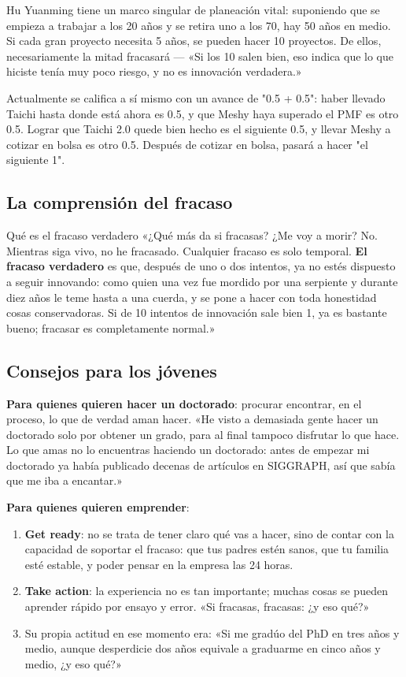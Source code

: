 Hu Yuanming tiene un marco singular de planeación vital: suponiendo que se empieza a trabajar a los 20 años y se retira uno a los 70, hay 50 años en medio. Si cada gran proyecto necesita 5 años, se pueden hacer 10 proyectos. De ellos, necesariamente la mitad fracasará — «Si los 10 salen bien, eso indica que lo que hiciste tenía muy poco riesgo, y no es innovación verdadera.»

Actualmente se califica a sí mismo con un avance de "0.5 + 0.5": haber llevado Taichi hasta donde está ahora es 0.5, y que Meshy haya superado el PMF es otro 0.5. Lograr que Taichi 2.0 quede bien hecho es el siguiente 0.5, y llevar Meshy a cotizar en bolsa es otro 0.5. Después de cotizar en bolsa, pasará a hacer "el siguiente 1".

\subsection{La comprensión del fracaso}

\begin{importantbox}{Qué es el fracaso verdadero}
«¿Qué más da si fracasas? ¿Me voy a morir? No. Mientras siga vivo, no he fracasado. Cualquier fracaso es solo temporal. \textbf{El fracaso verdadero} es que, después de uno o dos intentos, ya no estés dispuesto a seguir innovando: como quien una vez fue mordido por una serpiente y durante diez años le teme hasta a una cuerda, y se pone a hacer con toda honestidad cosas conservadoras. Si de 10 intentos de innovación sale bien 1, ya es bastante bueno; fracasar es completamente normal.»
\end{importantbox}

\subsection{Consejos para los jóvenes}

\textbf{Para quienes quieren hacer un doctorado}: procurar encontrar, en el proceso, lo que de verdad aman hacer. «He visto a demasiada gente hacer un doctorado solo por obtener un grado, para al final tampoco disfrutar lo que hace. Lo que amas no lo encuentras haciendo un doctorado: antes de empezar mi doctorado ya había publicado decenas de artículos en SIGGRAPH, así que sabía que me iba a encantar.»

\textbf{Para quienes quieren emprender}:
\begin{enumerate}
\item \textbf{Get ready}: no se trata de tener claro qué vas a hacer, sino de contar con la capacidad de soportar el fracaso: que tus padres estén sanos, que tu familia esté estable, y poder pensar en la empresa las 24 horas.
\item \textbf{Take action}: la experiencia no es tan importante; muchas cosas se pueden aprender rápido por ensayo y error. «Si fracasas, fracasas: ¿y eso qué?»
\item Su propia actitud en ese momento era: «Si me gradúo del PhD en tres años y medio, aunque desperdicie dos años equivale a graduarme en cinco años y medio, ¿y eso qué?»
\end{enumerate}

